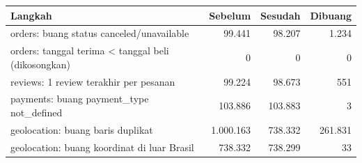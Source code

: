 \begin{tabular}{lrrr}
\toprule
Langkah & Sebelum & Sesudah & Dibuang \\
\midrule
orders: buang status canceled/unavailable & 99.441 & 98.207 & 1.234 \\
orders: tanggal terima < tanggal beli (dikosongkan) & 0 & 0 & 0 \\
reviews: 1 review terakhir per pesanan & 99.224 & 98.673 & 551 \\
payments: buang payment\_type not\_defined & 103.886 & 103.883 & 3 \\
geolocation: buang baris duplikat & 1.000.163 & 738.332 & 261.831 \\
geolocation: buang koordinat di luar Brasil & 738.332 & 738.299 & 33 \\
\bottomrule
\end{tabular}
